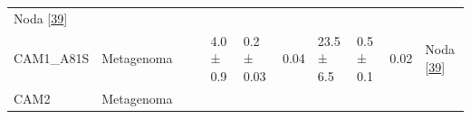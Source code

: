 \documentclass[12pt,twoside]{reedthesis}
\begin{document}
\begin{longtable}[]{@{}lllllllllll@{}}
\begin{minipage}[t]{0.11\columnwidth}
  Noda {[}\protect\hyperlink{ref-noda-garcia_insights_2015}{39}{]}\strut
  \end{minipage}\tabularnewline
  \begin{minipage}[t]{0.15\columnwidth}\raggedright\strut
  CAM1\_A81S\strut
  \end{minipage} & \begin{minipage}[t]{0.05\columnwidth}\raggedright\strut
  Metagenoma\strut
  \end{minipage} & \begin{minipage}[t]{0.04\columnwidth}\raggedright\strut
  \strut
  \end{minipage} & \begin{minipage}[t]{0.04\columnwidth}\raggedright\strut
  \strut
  \end{minipage} & \begin{minipage}[t]{0.06\columnwidth}\raggedright\strut
  4.0 ± 0.9\strut
  \end{minipage} & \begin{minipage}[t]{0.06\columnwidth}\raggedright\strut
  0.2 ± 0.03\strut
  \end{minipage} & \begin{minipage}[t]{0.06\columnwidth}\raggedright\strut
  0.04\strut
  \end{minipage} & \begin{minipage}[t]{0.05\columnwidth}\raggedright\strut
  23.5 ± 6.5\strut
  \end{minipage} & \begin{minipage}[t]{0.05\columnwidth}\raggedright\strut
  0.5 ± 0.1\strut
  \end{minipage} & \begin{minipage}[t]{0.03\columnwidth}\raggedright\strut
  0.02\strut
  \end{minipage} & \begin{minipage}[t]{0.11\columnwidth}\raggedright\strut
  Noda {[}\protect\hyperlink{ref-noda-garcia_insights_2015}{39}{]}\strut
  \end{minipage}\tabularnewline
  \begin{minipage}[t]{0.15\columnwidth}\raggedright\strut
  CAM2\strut
  \end{minipage} & \begin{minipage}[t]{0.05\columnwidth}\raggedright\strut
  Metagenoma\strut
  \end{minipage} & \begin{minipage}[t]{0.04\columnwidth}\raggedright\strut
  \strut
  \end{minipage} & \begin{minipage}[t]{0.04\columnwidth}\raggedright\strut

\end{minipage}
\end{longtable}
\end{document}
